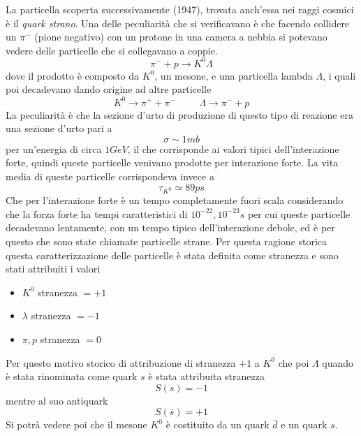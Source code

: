 La particella scoperta successivamente (1947), trovata anch'essa nei raggi cosmici è il \emph{quark strano}.
Una delle peculiarità che si verificavano è che facendo collidere un $\pi^-$ (pione negativo) con un protone in una camera a nebbia si potevano vedere delle particelle che si collegavano a coppie.
\begin{equation}
\pi^-+p\longrightarrow K^0 \Lambda
\end{equation}
dove il prodotto è composto da $K^0$, un mesone, e una particella lambda $\Lambda$, i quali poi decadevano dando origine ad altre particelle
\begin{equation}
K^0\longrightarrow \pi^++\pi^-\hspace{1cm} \Lambda\longrightarrow\pi^-+p
\end{equation}
La peculiarità è che la sezione d'urto di produzione di questo tipo di reazione era una sezione d'urto pari a
\begin{equation}
\sigma\sim 1mb
\end{equation}
per un'energia di circa $1GeV$, il che corrisponde ai valori tipici dell'interazione forte, quindi queste particelle venivano prodotte per interazione forte.
La vita media di queste particelle corrispondeva invece a 
\begin{equation}
\tau_{K^0}\simeq 89ps
\end{equation}
Che per l'interazione forte è un tempo completamente fuori scala considerando che la forza forte ha tempi caratteristici di $10^{-22}, 10^{-23}s$ per cui queste particelle decadevano lentamente, con un tempo tipico dell'interazione debole, ed è per questo che sono state chiamate particelle strane.
Per questa ragione storica questa caratterizzazione delle particelle è stata definita come stranezza e sono stati attribuiti i valori 
\begin{itemize}
\item $K^0$ stranezza $=+1$
\item $\lambda$ stranezza $=-1$ 
\item $\pi, p$ stranezza $=0$
\end{itemize}
Per questo motivo storico di attribuzione di stranezza $+1$ a $K^0$ che poi $\Lambda$ quando è stata rinominata come quark $s$ è stata attribuita stranezza 
\begin{equation}
S(s)=-1
\end{equation}
mentre al suo antiquark
\begin{equation}
S(\bar{s})=+1
\end{equation}
Si potrà vedere poi che il mesone $K^0$ è costituito da un quark $\bar{d}$ e un quark $s$.


